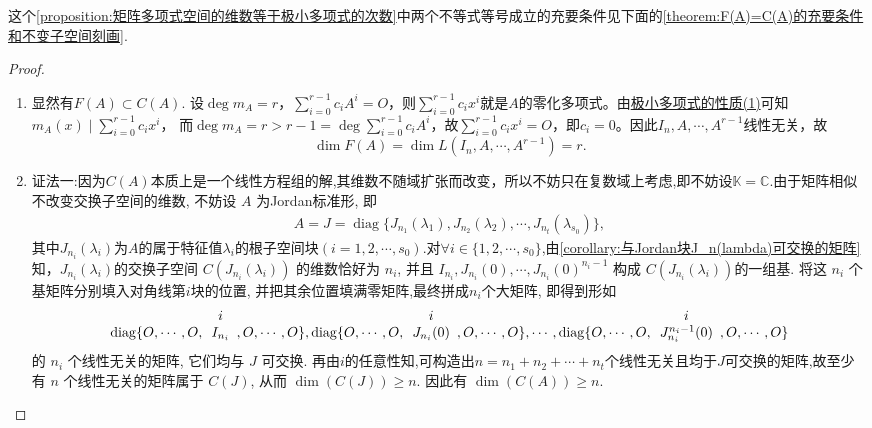 \documentclass[../../main.tex]{subfiles}%
\begin{document}
\begin{remark}
这个\cref{proposition:矩阵多项式空间的维数等于极小多项式的次数}中两个不等式等号成立的充要条件见下面的\cref{theorem:F(A)=C(A)的充要条件和不变子空间刻画}.
\end{remark}
\begin{proof}
\begin{enumerate}[(1)]
\item 显然有$F(A)\subset C(A)$.
设\(\deg m_A = r\)，\(\sum_{i = 0}^{r - 1} c_i A^i = O\)，则\(\sum_{i = 0}^{r - 1} c_i x^i\)就是\(A\)的零化多项式。由\hyperref[proposition:极小多项式的性质]{极小多项式的性质(1)}可知\(m_A(x) \mid \sum_{i = 0}^{r - 1} c_i x^i\)，  
而\(\deg m_A = r > r - 1 = \deg \sum_{i = 0}^{r - 1} c_i A^i\)，故\(\sum_{i = 0}^{r - 1} c_i x^i = O\)，即\(c_i = 0\)。因此\(I_n, A, \cdots, A^{r - 1}\)线性无关，故  
\[
\dim F(A) = \dim L(I_n, A, \cdots, A^{r - 1}) = r.
\]

\item {\color{blue}证法一:}因为$C(A)$本质上是一个线性方程组的解,其维数不随域扩张而改变，所以不妨只在复数域上考虑,即不妨设$\mathbb{K}=\mathbb{C}$.由于矩阵相似不改变交换子空间的维数, 不妨设 \(A\) 为Jordan标准形, 即
\begin{align*}
A = J = \operatorname{diag}\{J_{n_1}(\lambda_1), J_{n_2}(\lambda_2), \cdots, J_{n_t}(\lambda_{s_0})\},
\end{align*}
其中$J_{n_i}(\lambda_i)$为$A$的属于特征值$\lambda_i$的根子空间块$(i=1,2,\cdots,s_0)$.对$\forall i\in \{1,2,\cdots,s_0\}$,由\cref{corollary:与Jordan块J_n(lambda)可交换的矩阵}知，\(J_{n_i}(\lambda_i)\)的交换子空间 \(C(J_{n_i}(\lambda_i))\) 的维数恰好为 \(n_i\), 并且 \(I_{n_i}, J_{n_i}(0), \cdots, J_{n_i}(0)^{n_i-1}\) 构成 \(C(J_{n_i}(\lambda_i))\)的一组基. 将这 \(n_i\) 个基矩阵分别填入对角线第$i$块的位置, 并把其余位置填满零矩阵,最终拼成\(n_i\)个大矩阵, 即得到形如
\begin{align*}
\operatorname{diag}\{O, \cdots, O, \begin{array}[b]{c} i \\ I_{n_i} \end{array}, O, \cdots, O\},
\operatorname{diag}\{O, \cdots, O, \begin{array}[b]{c} i \\ J_{n_i}(0) \end{array}, O, \cdots, O\},\cdots,
\operatorname{diag}\{O, \cdots, O, \begin{array}[b]{c} i \\ J_{n_i}^{n_i-1}(0) \end{array}, O, \cdots, O\}
\end{align*}
的 \(n_i\) 个线性无关的矩阵, 它们均与 \(J\) 可交换. 再由$i$的任意性知,可构造出\(n = n_1 + n_2 + \cdots + n_t\)个线性无关且均于$J$可交换的矩阵,故至少有 \(n\) 个线性无关的矩阵属于 \(C(J)\), 从而 \(\dim(C(J)) \geqslant n\). 因此有 \(\dim(C(A)) \geqslant n\).


\end{enumerate}
\end{proof}
\end{document}
